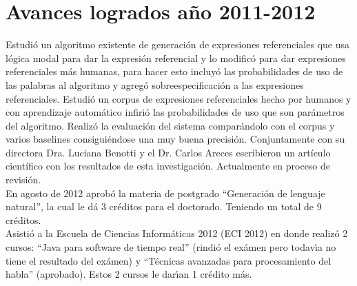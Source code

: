 \section{Avances logrados a\~no 2011-2012 }
\label{progreso}

Estudi\'o un algoritmo existente de generaci\'on de expresiones referenciales que usa l\'ogica modal para dar la 
expresi\'on referencial y lo modific\'o para dar expresiones referenciales m\'as humanas, para hacer 
esto incluy\'o las probabilidades de uso de las palabras al algoritmo y agreg\'o 
sobreespecificaci\'on a las expresiones referenciales. Estudi\'o un corpus de expresiones 
referenciales hecho por humanos y con aprendizaje autom\'atico infiri\'o las probabilidades de uso 
que son par\'ametros del algoritmo. Realiz\'o la evaluaci\'on del sistema compar\'andolo con el corpus 
y varios baselines consigui\'endose una muy buena precisi\'on. 
Conjuntamente con su directora Dra. Luciana Benotti y el Dr. Carlos Areces escribieron un art\'iculo cient\'ifico 
con los resultados de esta investigaci\'on. Actualmente en proceso de revisi\'on.\\
En agosto de 2012 aprob\'o la materia de postgrado ``Generaci\'on de lenguaje natural'', la cual le d\'a 3 cr\'editos para el doctorado.
Teniendo un total de 9 cr\'editos.\\
Asisti\'o a la Escuela de Ciencias Inform\'aticas 2012 (ECI 2012) en donde realiz\'o 2 cursos: ``Java para software de tiempo real'' 
(rindi\'o el ex\'amen pero todav\'{\i}a no tiene el resultado del ex\'amen)
y ``T\'ecnicas avanzadas para procesamiento del habla'' (aprobado). Estos 2 cursos le dar\'{\i}an 1 cr\'edito m\'as.\\




